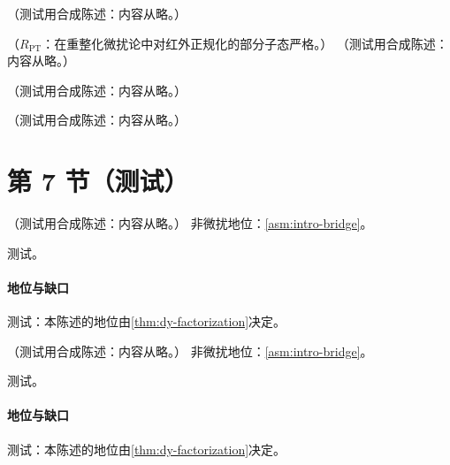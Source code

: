 \begin{example}\label{ex:dy-nlo}
（测试用合成陈述：内容从略。）
\end{example}

\begin{proposition}\label{prop:dy-scale}
（$R_{\mathrm{PT}}$：在重整化微扰论中对红外正规化的部分子态严格。）
（测试用合成陈述：内容从略。）
\end{proposition}

\begin{remark}\label{rem:dy-dis-scheme}
（测试用合成陈述：内容从略。）
\end{remark}

\begin{example}[大 $N$ 极限]\label{ex:dy-threshold}
（测试用合成陈述：内容从略。）
\end{example}

\section{第 7 节（测试）}\label{sec:dy-nlo}

\begin{theorem}\label{thm:dy-colour-singlet}
（测试用合成陈述：内容从略。）
非微扰地位：\cref{asm:intro-bridge}。
\end{theorem}
\begin{proofsketch}测试。\end{proofsketch}
\paragraph{地位与缺口}测试：本陈述的地位由\cref{thm:dy-factorization}决定。

\begin{theorem}\label{thm:dy-polarized}
（测试用合成陈述：内容从略。）
非微扰地位：\cref{asm:intro-bridge}。
\end{theorem}
\begin{proofsketch}测试。\end{proofsketch}
\paragraph{地位与缺口}测试：本陈述的地位由\cref{thm:dy-factorization}决定。

